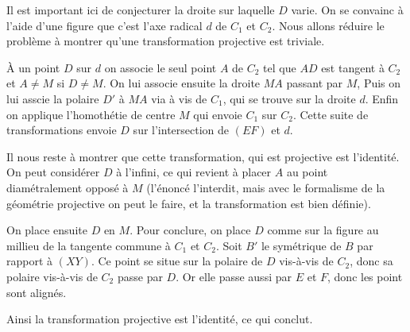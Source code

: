 \begin{sol}
Il est important ici de conjecturer la droite sur laquelle $D$ varie. On se convainc à l'aide d'une figure que c'est l'axe radical $d$ de $C_1$ et $C_2$. Nous allons réduire le problème à montrer qu'une transformation projective est triviale.

\medskip

À un point $D$ sur $d$ on associe le seul point $A$ de $C_2$ tel que $AD$ est tangent à $C_2$ et $A\ne M$ si $D\ne M$. On lui associe ensuite la droite $MA$ passant par $M$, Puis on lui asscie la polaire $D'$ à $MA$ via à vis de $C_1$, qui se trouve sur la droite $d$. Enfin on applique l'homothétie de centre $M$ qui envoie $C_1$ sur $C_2$. Cette suite de transformations envoie $D$ sur l'intersection de $(EF)$ et $d$.

\medskip

Il nous reste à montrer que cette transformation, qui est projective est l'identité. On peut considérer $D$ à l'infini, ce qui revient à placer $A$ au point diamétralement opposé à $M$ (l'énoncé l'interdit, mais avec le formalisme de la géométrie projective on peut le faire, et la transformation est bien définie).

On place ensuite $D$ en $M$. Pour conclure, on place $D$ comme sur la figure au millieu de la tangente commune à $C_1$ et $C_2$. Soit $B'$ le symétrique de $B$ par rapport à $(XY)$. Ce point se situe sur la polaire de $D$ vis-à-vis de $C_2$, donc sa polaire vis-à-vis de $C_2$ passe par $D$. Or elle passe aussi par $E$ et $F$, donc les point sont alignés.

\medskip

Ainsi la transformation projective est l'identité, ce qui conclut.
\end{sol}

%
